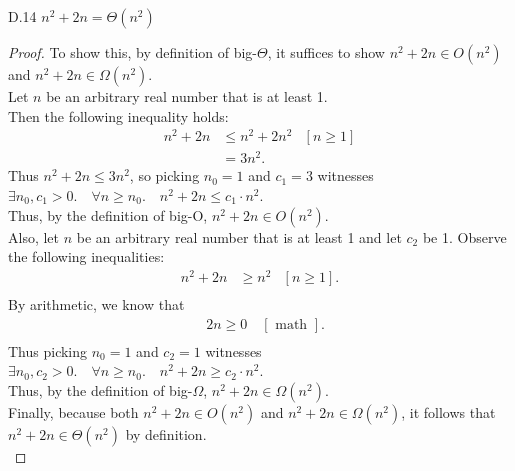 \documentclass[10pt]{article}
\begin{document}
\begin{enumerate}[label={}]
          D.14 $n^2+2 n=\Theta\left(n^2\right)$
          \begin{proof}
              To show this, by definition of big-$\Theta$, it suffices to show $n^2+2n \in O\left(n^2\right)$ and $n^2+2n \in \Omega\left(n^2\right)$.\\
              Let $n$ be an arbitrary real number that is at least 1.\\
              Then the following inequality holds:
              $$
                  \begin{aligned}
                      n^2+2 n & \leq n^2+2 n^2
                              & {\left[n \geq 1\right] } \\
                              & = 3n^2 .
                  \end{aligned}
              $$
              Thus $n^2+2 n \leq 3n^2$, so picking $n_0=1$ and $c_1=3$ witnesses \\$\exists n_0, c_1>0 .\quad \forall n \geq n_0 .\quad n^2+2 n \leq c_1 \cdot n^2$.\\
                  Thus, by the definition of big-O, $n^2+2 n \in O\left(n^2\right)$.\\
                  Also, let $n$ be an arbitrary real number that is at least 1 and let $c_2$ be 1. Observe the following inequalities:
                  $$
                      \begin{aligned}
                          n^2+2 n & \geq n^2
                                  & {\left[n \geq 1\right] }. \\
                      \end{aligned}
                  $$
                  By arithmetic, we know that
                  $$
                      \begin{aligned}
                           & 2n \geq 0 \quad [\text { math }]. \\
                      \end{aligned}
                  $$
                  Thus picking $n_0=1$ and $c_2=1$ witnesses \\$\exists n_0, c_2>0 .\quad \forall n \geq n_0 .\quad n^2+2 n \geq c_2 \cdot n^2$.\\
                  Thus, by the definition of big-$\Omega$, $n^2+2 n \in \Omega\left(n^2\right)$.\\
                  Finally, because both $n^2+2 n \in O\left(n^2\right)$ and $n^2+2 n \in \Omega\left(n^2\right)$, it follows that $n^2+2 n\in\Theta(n^2)$ by definition.\\
          \end{proof}


\end{enumerate}
\end{document}
